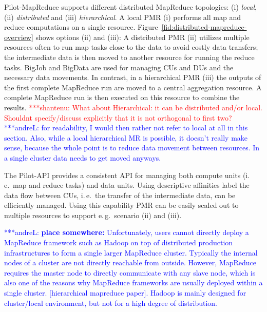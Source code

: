 \documentclass{acm_proc_article-sp}
\newcommand{\jhanote}[1]{ {\textcolor{red} { ***shantenu: #1 }}}
\newcommand{\alnote}[1]{ {\textcolor{blue} { ***andreL: #1 }}}
\newcommand{\alnote}[1]{}
\newcommand{\jhanote}[1]{}
\newcommand{\pilotmapreduce}{Pilot-MapReduce\xspace}
\begin{document}
\pilotmapreduce supports different distributed MapReduce topologies:
(i) \emph{local}, (ii) \emph{distributed} and (iii)
\emph{hierarchical}. A local PMR (i) performs all map and reduce
computations on a single resource.
Figure~\ref{fid:distributed-mapreduce-overview} shows options (ii) and
(iii): A distributed PMR (ii) utilizes multiple resources often to run
map tasks close to the data to avoid costly data transfers; the
intermediate data is then moved to another resource for running the
reduce tasks. BigJob and BigData are used for managing CUs and DUs and
the necessary data movements. In contrast, in a hierarchical PMR (iii)
the outputs of the first complete MapReduce run are moved to a central
aggregation resource. A complete MapReduce run is then executed on
this resource to combine the results. \jhanote{What about
  Hierarchical: it can be distributed and/or local. Shouldnt
  specify/discuss explicitly that it is not orthogonal to first two?}
\alnote{for readability, I would then rather not refer to local at all
  in this section. Also, while a local hierarchical MR is possible, it
  doesn't really make sense, because the whole point is to reduce data
  movement between resources. In a single cluster data needs to get
  moved anyways.}


The Pilot-API provides a consistent API for managing both compute units (i.\,e.\ 
map and reduce tasks) and data units. Using descriptive affinities label the  
data flow between CUs, i.\,e.\ the transfer of the intermediate data, can be 
efficiently managed. Using this capability PMR can be easily scaled out to 
multiple resources to support e.\,g.\ scenario (ii) and (iii). 



\alnote{\textbf{place somewhere:} Unfortunately, users cannot directly deploy a MapReduce framework such as Hadoop
on top of distributed production infrastructures to form a single larger
MapReduce cluster. Typically the internal nodes of a cluster are not directly
reachable from outside. However, MapReduce requires the master node to directly
communicate with any slave node, which is also one of the reasons why MapReduce
frameworks are usually deployed within a single cluster. [hierarchical mapreduce
paper]. Hadoop is mainly designed for cluster/local environment, but not for a
high degree of distribution.}
\end{document}
